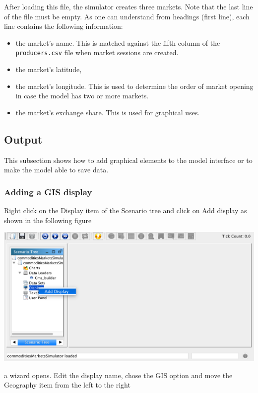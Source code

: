 \documentclass{article}
\begin{document}
After loading this file, the simulator creates three markets. Note that the last line of the file must be empty.
As one can understand from headings (first line), each line contains the following information:
\begin{itemize}
	\item the market's name. This is matched against the fifth column of the \verb+producers.csv+ file when market sessions are created.
	\item the market's latitude,
	\item the market's longitude. This is used to determine the order of market opening in case the model has two or more markets.
	\item the market's exchange share. This is used for graphical uses.
\end{itemize}


\subsection{Output}
This subsection shows how to add graphical elements to the model interface or to make the model able to save data.

\subsubsection{Adding a GIS display}

Right click on the Display item of the Scenario tree and click on Add display as shown in the following figure

\vskip2mm
\includegraphics[scale=0.35]{fig_cms_rs_gis1}

\vskip2mm
a wizard opens. Edit the display name, chose the GIS option and move the Geography item from the left to the right
\end{document}
